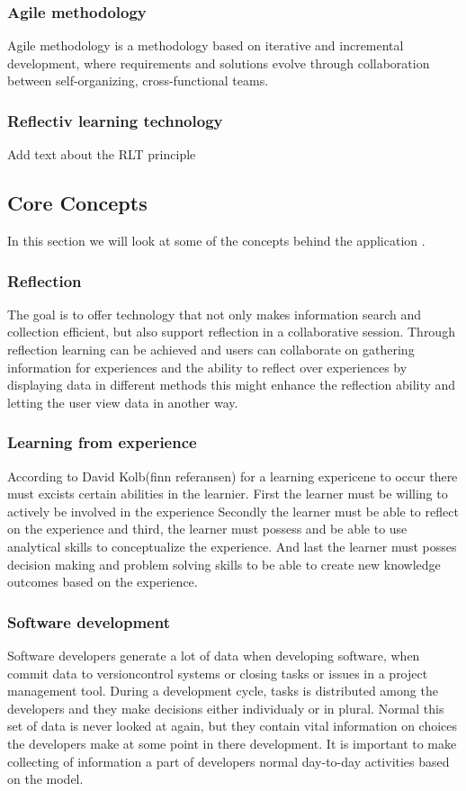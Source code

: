 \subsubsection{Agile methodology}
Agile methodology is a methodology based on iterative and incremental development, where requirements and solutions evolve through collaboration between self-organizing, cross-functional teams.

\subsubsection{Reflectiv learning technology}
Add text about the RLT principle


\subsection{Core Concepts}
In this section we will look at some of the concepts behind the application	.

\subsubsection{Reflection}
The goal is to offer technology that not only makes information search and collection efficient, but also support reflection in a collaborative session. Through reflection learning can be achieved and users can collaborate on gathering information for experiences and the ability to reflect over experiences by displaying data in different methods this might enhance the reflection ability and letting the user view data in another way.

\subsubsection{Learning from experience}
According to David Kolb(finn referansen) for a learning expericene to occur there must excists certain abilities in the learnier. First the learner must be willing to actively be involved in the experience Secondly the learner must be able to reflect on the experience and third, the learner must possess and be able to use analytical skills to conceptualize the experience. And last the learner must posses decision making and problem solving skills to be able to create new knowledge outcomes based on the experience.

\subsubsection{Software development}
Software developers generate a lot of data when developing software, when commit data to versioncontrol systems or closing tasks or issues in a project management tool. During a development cycle, tasks is distributed among the developers and they make decisions either individualy or in plural. Normal this set of data is never looked at again, but they contain vital information on choices the developers make at some point in there development. It is important to make collecting of information a part of developers normal day-to-day activities based on the model\cite{Krogstie2009}.

